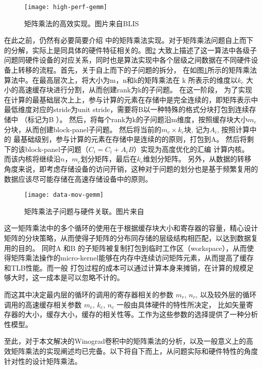 \begin{figure}
  \centering
  \texttt{[image: high-perf-gemm]}
  \caption{矩阵乘法的高效实现。图片来自BLIS\protect\cite{Low2016AnalyticalMI}}
  \label{fig:blis-gemm}
\end{figure}
在此之前，仍然有必要简要介绍\cite{BLIS1} 中的矩阵乘法实现。对于矩阵乘法问题自上而下的分解，实际上是同具体的硬件特征相关的。图\ref{fig:gemm-hw} 大致上描述了这一算法中各级子问题同硬件设备的对应关系，同时也是算法实现中各个层级之间数据在不同硬件设备上转移的流程。首先，关于自上而下的子问题的拆分，
在如图\ref{fig:blis-gemm}所示的矩阵乘法算法中。在最高层次上，将大小为m，n和k的矩阵乘法在 k 所表示的维度以$k_c$ 大小的高速缓存块进行分割，从而创建rank为k的子问题。 在这一阶段，
为了实现在计算的最基础层次上上，参与计算的元素在存储中是完全连续的，即矩阵表示中最低维度对应的stride为unit stride，需要将B以一种特殊的格式分块打包到连续存储中
（标记为B ）。 然后，将每个rank为k的子问题沿m维度，按照缓存块大小$m_c$分块，从而创建block-panel子问题。 然后将当前的$m_c×k_c$块, 记为$A_i$, 按照计算中的
最基础级别，参与计算的元素在存储中是连续的的原则，打包到A。 然后将剩下的该block-panel子问题（$C_i = C_i + A_i B$）实现为高度优化的汇编
计算内核。 而该内核将继续沿$n$，$m_c$划分矩阵，最后在$k_c$维划分矩阵。
另外，从数据的转移角度来说，即考虑存储设备的访问开销，这种对于问题的划分也是基于频繁复用的数据应该尽可能存储在高速存储设备中的原则。

\begin{figure}
  \centering
  \texttt{[image: data-mov-gemm]}
  \caption{矩阵乘法子问题与硬件关联。图片来自\protect\cite{Low2016AnalyticalMI}}
  \label{fig:gemm-hw}
\end{figure}

这一矩阵乘法中的多个循环的使用在于根据缓存块大小和寄存器的容量，精心设计矩阵的分块策略，从而使得子矩阵的分布同存储的层级结构相匹配，以达到数据复用的目的。
同时A 和B 的子矩阵被复制打包到临时工作区（workspace），从而使得矩阵乘法操作的micro-kernel能够在内存中连续访问矩阵元素，从而提高了缓存和TLB性能。而一般
打包过程的成本可以通过计算本身来摊销，在计算的规模足够大时，这一成本是可以忽略不计的。

而这其中决定最内层的循环的调用的寄存器相关的参数 $m_r$, $n_r$, 以及较外层的循环调用的高速缓存相关参数 $m_c$, $k_c$, $n_c$ 一般由具体硬件的特性所决定，
比如矢量寄存器的大小，缓存大小，缓存的相关性等。工作\cite{Low2016AnalyticalMI}为这些参数的选择提供了一种分析性模型。


至此，对于本文解决的Winograd卷积中的矩阵乘法的分析，以及一般意义上的高效矩阵乘法的实现阐述均已完备。以下将自下而上，从问题实际和硬件特性的角度针对性的设计矩阵乘法。

